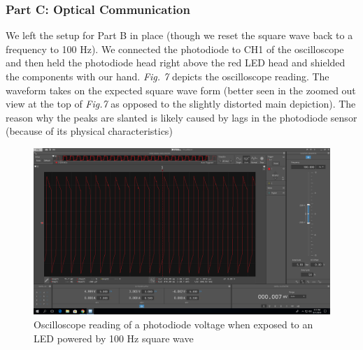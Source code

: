 \documentclass[10pt]{article}
\begin{document}
\subsubsection{Part C: Optical Communication}
We left the setup for Part B in place (though we reset the square wave back to a frequency to 100 Hz). We connected the photodiode to CH1 of the oscilloscope and then held the photodiode head right above the red LED head and shielded the components with our hand. \textit{Fig. 7} depicts the oscilloscope reading. The waveform takes on the expected square wave form (better seen in the zoomed out view at the top of \textit{Fig.7} as opposed to the slightly distorted main depiction). The reason why the peaks are slanted is likely caused by lags in the photodiode sensor (because of its physical characteristics) 
\begin{center}
	\begin{figure} [H]
		\centering
		\includegraphics[scale=0.22]{images/opticalsquare.png}
		\caption{Oscilloscope reading of a photodiode voltage when exposed to an LED powered by 100 Hz square wave}
	\end{figure}
\end{center}
\end{document}
